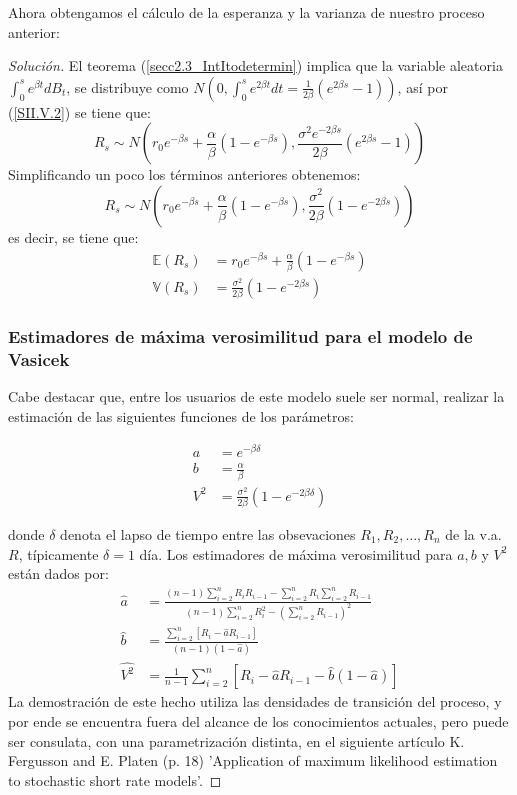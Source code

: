 \documentclass[11pt,notitlepage]{article}
\newenvironment{solucion}
  {\begin{proof}[Solución]}
  {\end{proof}}
\begin{document}
    Ahora obtengamos el cálculo de la esperanza y la varianza de nuestro proceso anterior:
    \begin{solucion}
    El teorema (\ref{secc2.3_IntItodetermin}) implica que la variable aleatoria \(\int_{0}^{s}e^{\beta t}dB_t\), se distribuye como \(N\left(0,\int_{0}^{s}e^{2\beta t}dt = \frac{1}{2\beta}
\left(e^{2\beta s} - 1 \right) \right)\), así por (\ref{SII.V.2}) se tiene que: \[R_s\sim N\left( r_0e^{-\beta s} + \frac{\alpha}{\beta}\left(1 - e^{-\beta s} \right),\frac{\sigma^2 e^{-2\beta s}}{2\beta}
\left(e^{2\beta s} - 1 \right)\right)\]
Simplificando un poco los términos anteriores obtenemos: 
\begin{equation*}
    R_s\sim N\left( r_0e^{-\beta s} + \frac{\alpha}{\beta}\left(1 - e^{-\beta s} \right),\frac{\sigma^2}{2\beta}
\left(1 - e^{-2\beta s} \right)\right)
\end{equation*}
es decir, se tiene que:
\begin{align*}
    \mathbb{E}(R_s) &= r_0e^{-\beta s} + \frac{\alpha}{\beta}\left(1 - e^{-\beta s} \right)\\
    \mathbb{V}(R_s) &= \frac{\sigma^2}{2\beta}\left(1 - e^{-2\beta s} \right)
\end{align*}

\subsubsection{Estimadores de máxima verosimilitud para el modelo de Vasicek}

Cabe destacar que, entre los usuarios de este modelo suele ser normal, realizar la estimación de las siguientes funciones de los parámetros: 

\begin{align}\label{SII.VA.3}
    a &= e^{-\beta\delta}\\
    b &= \frac{\alpha}{\beta}\\
    V^2 &= \frac{\sigma^2}{2\beta}\left(1 - e^{-2\beta \delta}\right)
\end{align}

donde \(\delta\) denota el lapso de tiempo entre las obsevaciones \(R_1,R_2,\hdots,R_n\) de la v.a. \(R\), típicamente \(\delta = 1\) día. Los estimadores de máxima verosimilitud para \(a,b\) y \(V^2\) están dados por: 
\begin{align}\label{SII.VA.4}
    \hat{a} &= \frac{(n-1)\sum_{i=2}^{n}R_{i}R_{i-1} - \sum_{i=2}^{n}R_i\sum_{i=2}^{n}R_{i-1}}{(n-1)\sum_{i=2}^{n}R_{i}^2 - \left(\sum_{i=2}^{n}R_{i-1}\right)^2}\\
    \hat{b} &= \frac{\sum_{i=2}^{n}\left[R_i - \hat{a}R_{i-1}\right]}{(n-1)(1-\hat{a})}\\
    \hat{V^2} &= \frac{1}{n-1}\sum_{i=2}^{n}\left[R_i - \hat{a}R_{i-1} -\hat{b}(1-\hat{a}) \right]
\end{align}
La demostración de este hecho utiliza las densidades de transición del proceso, y por ende se encuentra fuera del alcance de los conocimientos actuales, pero puede ser consulata, con una parametrización distinta, en el siguiente artículo K. Fergusson and E. Platen (p. 18) 'Application of maximum likelihood estimation to stochastic short rate models'.
     \end{solucion}
     
\end{document}
